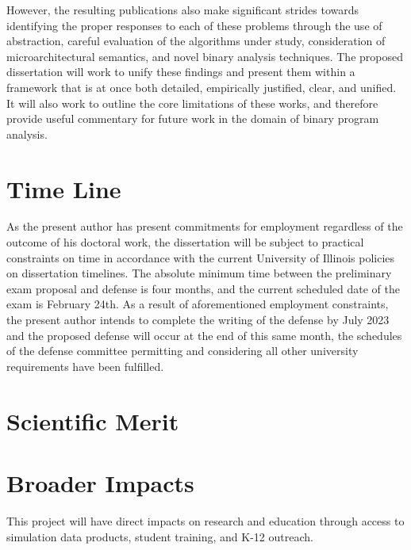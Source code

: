 However, the resulting publications also make significant strides towards identifying the proper responses to each of these problems through the use of abstraction, careful evaluation of the algorithms under study, consideration of microarchitectural semantics, and novel binary analysis techniques.
The proposed dissertation will work to unify these findings and present them within a framework that is at once both detailed, empirically justified, clear, and unified.
It will also work to outline the core limitations of these works, and therefore provide useful commentary for future work in the domain of binary program analysis.

\section{Time Line}

As the present author has present commitments for employment regardless of the outcome of his doctoral work, the dissertation will be subject to practical constraints on time in accordance with the current University of Illinois policies on dissertation timelines.
The absolute minimum time between the preliminary exam proposal and defense is four months, and the current scheduled date of the exam is February 24th.
As a result of aforementioned employment constraints, the present author intends to complete the writing of the defense by July 2023 and the proposed defense will occur at the end of this same month, the schedules of the defense committee permitting and considering all other university requirements have been fulfilled.

\section{Scientific Merit}




\section{Broader Impacts}
\label{broadimpacts}
\vspace*{-8pt}

This project will have direct impacts on research and education through access to simulation data products, student training, and K-12 outreach.  

